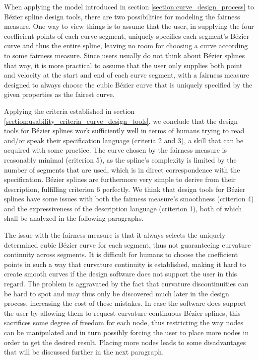 \documentclass[a4paper]{article}
\begin{document}
				When applying the model introduced in section \ref{section:curve_design_process} to Bézier spline design tools, there are two possibilities for modeling the fairness measure. One way to view things is to assume that the user, in supplying the four coefficient points of each curve segment, uniquely specifies each segment's Bézier curve and thus the entire spline, leaving no room for choosing a curve according to some fairness measure. Since users usually do not think about Bézier splines that way, it is more practical to assume that the user only supplies both point and velocity at the start and end of each curve segment, with a fairness measure designed to always choose the cubic Bézier curve that is uniquely specified by the given properties as the fairest curve.

				Applying the criteria established in section \ref{section:usability_criteria_curve_design_tools}, we conclude that the design tools for Bézier splines work sufficiently well in terms of humans trying to read and/or speak their specification language (criteria 2 and 3), a skill that can be acquired with some practice. The curve chosen by the fairness measure is reasonably minimal (criterion 5), as the spline's complexity is limited by the number of segments that are used, which is in direct correspondence with the specification. Bézier splines are furthermore very simple to derive from their description, fulfilling criterion 6 perfectly. We think that design tools for Bézier splines have some issues with both the fairness measure's smoothness (criterion 4) and the expressiveness of the description language (criterion 1), both of which shall be analyzed in the following paragraphs.

				The issue with the fairness measure is that it always selects the uniquely determined cubic Bézier curve for each segment, thus not guaranteeing curvature continuity across segments. It is difficult for humans to choose the coefficient points in such a way that curvature continuity is established, making it hard to create smooth curves if the design software does not support the user in this regard. The problem is aggravated by the fact that curvature discontinuities can be hard to spot and may thus only be discovered much later in the design process, increasing the cost of these mistakes. In case the software does support the user by allowing them to request curvature continuous Bézier splines, this sacrifices some degree of freedom for each node, thus restricting the way nodes can be manipulated and in turn possibly forcing the user to place more nodes in order to get the desired result. Placing more nodes leads to some disadvantages that will be discussed further in the next paragraph.
\end{document}
